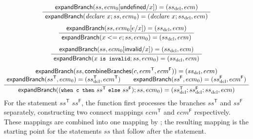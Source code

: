 \begin{gather*}
    \label{rule-expandwhen-declare}
    \infer[]
    {\seqq{\expandbranch(\mathit{declare}\ x ; ss, ecm_0) = (\mathit{declare}\ x ; ss_\mathrm{dcl}, ecm)}}
    {\seqq{\expandbranch(ss, ecm_0[\svundefined/x]) = (ss_\mathrm{dcl}, ecm)}}
\\[1ex]
    \label{rule-expandwhen-connect}
    \infer[]
    {\seqq{\expandbranch(x <= e ; ss, ecm_0) = (ss_\mathrm{dcl}, ecm)}}
    {\seqq{\expandbranch(ss, ecm_0[e/x]) = (ss_\mathrm{dcl}, ecm)}}
\\[1ex]
    \label{rule-expandwhen-invalid}
    \infer[]
    {\seqq{\expandbranch(x \text{ \prettyll{is invalid}} ; ss, ecm_0) = (ss_\mathrm{dcl}, ecm)}}
    {\seqq{\expandbranch(ss, ecm_0[{\svinvalid}/x]) = (ss_\mathrm{dcl}, ecm)}}
    \\[1ex]
    \label{rule-expandwhen-when}
    \infer[]
    {\seqq{\expandbranch((\text{\prettyll{when c then} } ss^\mathsf{T} \text{ \prettyll{else} } ss^\mathsf{F}) ; ss, ecm_0) =
        (ss_\mathrm{dcl}^\mathsf{T} ; ss_\mathrm{dcl}^\mathsf{F} ; ss_\mathrm{dcl}^{\phantom{\mathsf{F}}}, ecm)}}
    {\begin{gathered} \seqq{\expandbranch(ss, \combinebranches(c, ecm^\mathsf{T}, ecm^\mathsf{F})) = (ss_\mathrm{dcl}, ecm)} \\[-0.4em]
     \seqq{\expandbranch(ss^\mathsf{T}, ecm_0) = (ss_\mathrm{dcl}^\mathsf{T}, ecm^\mathsf{T})} \qquad
     \seqq{\expandbranch(ss^\mathsf{F}, ecm_0) = (ss_\mathrm{dcl}^\mathsf{F}, ecm^\mathsf{F})} \end{gathered}}
\end{gather*}
%
For the statement  $ss^\mathsf{T}$  $ss^\mathsf{F}$,
 the function {\expandbranch} first processes the branches $ss^\mathsf{T}$ and $ss^\mathsf{F}$ separately,
 constructing two connect mappings $ecm^\mathsf{T}$ and $ecm^\mathsf{F}$ respectively.
 These mappings are combined into one mapping by {\combinebranches};
 the resulting mapping is the starting point for the statements $ss$ that follow after the  statement.




